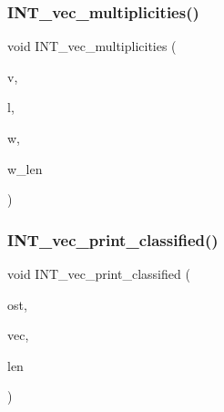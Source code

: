 \mbox{\label{sorting_8_c_a061ed37a43ae39fa10a91e71145cee06}} 
\subsubsection{\texorpdfstring{I\+N\+T\+\_\+vec\+\_\+multiplicities()}{INT\_vec\_multiplicities()}}
{\footnotesize\ttfamily void I\+N\+T\+\_\+vec\+\_\+multiplicities (\begin{DoxyParamCaption}\item[{\mbox{\hyperlink{galois_8h_a09fddde158a3a20bd2dcadb609de11dc}{I\+NT}} $\ast$}]{v,  }\item[{\mbox{\hyperlink{galois_8h_a09fddde158a3a20bd2dcadb609de11dc}{I\+NT}}}]{l,  }\item[{\mbox{\hyperlink{galois_8h_a09fddde158a3a20bd2dcadb609de11dc}{I\+NT}} $\ast$\&}]{w,  }\item[{\mbox{\hyperlink{galois_8h_a09fddde158a3a20bd2dcadb609de11dc}{I\+NT}} \&}]{w\+\_\+len }\end{DoxyParamCaption})}

\mbox{\label{sorting_8_c_a611d0260b154d48ecbc38ed869925ba8}} 
\subsubsection{\texorpdfstring{I\+N\+T\+\_\+vec\+\_\+print\+\_\+classified()}{INT\_vec\_print\_classified()}}
{\footnotesize\ttfamily void I\+N\+T\+\_\+vec\+\_\+print\+\_\+classified (\begin{DoxyParamCaption}\item[{ostream \&}]{ost,  }\item[{\mbox{\hyperlink{galois_8h_a09fddde158a3a20bd2dcadb609de11dc}{I\+NT}} $\ast$}]{vec,  }\item[{\mbox{\hyperlink{galois_8h_a09fddde158a3a20bd2dcadb609de11dc}{I\+NT}}}]{len }\end{DoxyParamCaption})}

\mbox{\label{sorting_8_c_a6221e1e733ab938c9bd30f5f829efa6b}} 
